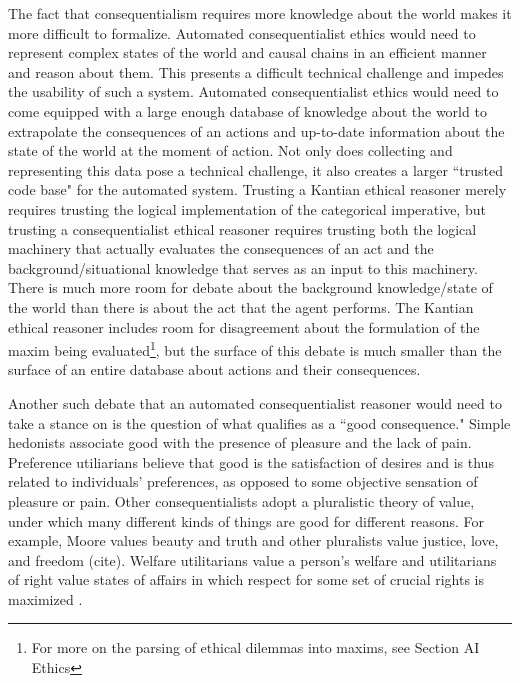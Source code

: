 \begin{isabellebody}
\begin{isamarkuptext}
The fact that consequentialism requires more knowledge about the world makes it more difficult to formalize.
Automated consequentialist ethics would need to represent complex states of the world and causal chains
in an efficient manner and reason about them. This presents a difficult technical challenge and
impedes the usability of such a system. Automated consequentialist ethics would need to come equipped with 
a large enough database of knowledge about the world to extrapolate the consequences of an actions and
up-to-date information about the state of the world at the moment of action. Not only does collecting 
and representing this data pose a technical challenge, it also creates a larger ``trusted code base" for 
the automated system. Trusting a Kantian ethical reasoner merely requires trusting the logical implementation
of the categorical imperative, but trusting a consequentialist ethical reasoner requires trusting both the
logical machinery that actually evaluates the consequences of an act and the background/situational
knowledge that serves as an input to this machinery. There is much more room for debate about 
the background knowledge/state of the world than there is about the act that the agent performs.
The Kantian ethical reasoner includes room for 
disagreement about the formulation of the maxim being evaluated\footnote{For more on the parsing 
of ethical dilemmas into maxims, see Section AI Ethics}, but the surface of this debate is much smaller
than the surface of an entire database about actions and their consequences. 

Another such debate that an automated consequentialist reasoner would need to take a stance on is 
the question of what qualifies as a ``good consequence." Simple hedonists associate
good with the presence of pleasure and the lack of pain. Preference utiliarians believe that good is 
the satisfaction of desires and is thus related to individuals' preferences, as opposed to some objective
sensation of pleasure or pain. Other consequentialists adopt a pluralistic theory of value, under which 
many different kinds of things are good for different reasons. For example, Moore values beauty and truth 
and other pluralists value justice, love, and freedom (cite). Welfare utilitarians value a person's 
welfare and utilitarians of right value states of affairs in which respect for some set of crucial
rights is maximized \cite{consequentialismsep}.


\end{isamarkuptext}
\end{isabellebody}
